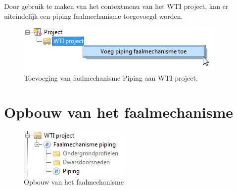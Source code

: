 Door gebruik te maken van het contextmenu van het WTI project, kan er uiteindelijk een piping faalmechanisme toegevoegd worden.

\begin{figure} [H]
	\centering
		\includegraphics{figures/chapter_piping/addPipingMechanismToProject}
	\caption{Toevoeging van faalmechanisme Piping aan WTI project.}
	\label{fig:fig5.3}
\end{figure}


\section{Opbouw van het faalmechanisme}

\begin{figure} [H]
	\centering
		\includegraphics{figures/chapter_piping/OpbouwFaalmechanisme}
	\caption{Opbouw van het faalmechanisme}
	\label{fig:fig5.4}
\end{figure}

